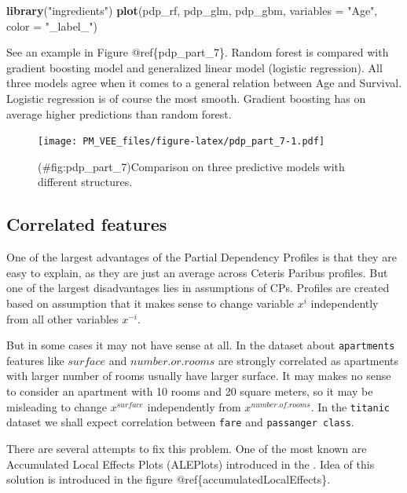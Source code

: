 \documentclass[]{krantz}
\newenvironment{Shaded}{\begin{snugshade}}{\end{snugshade}}
\newcommand{\DataTypeTok}[1]{\textcolor[rgb]{0.13,0.29,0.53}{#1}}
\newcommand{\KeywordTok}[1]{\textcolor[rgb]{0.13,0.29,0.53}{\textbf{#1}}}
\newcommand{\NormalTok}[1]{#1}
\newcommand{\StringTok}[1]{\textcolor[rgb]{0.31,0.60,0.02}{#1}}
\theoremstyle{definition}
\theoremstyle{definition}
\theoremstyle{definition}
\theoremstyle{remark}
\begin{document}
\begin{Shaded}
\begin{Highlighting}[]
\KeywordTok{library}\NormalTok{(}\StringTok{"ingredients"}\NormalTok{)}
\KeywordTok{plot}\NormalTok{(pdp_rf, pdp_glm, pdp_gbm, }\DataTypeTok{variables =} \StringTok{"Age"}\NormalTok{, }\DataTypeTok{color =} \StringTok{"_label_"}\NormalTok{)}
\end{Highlighting}
\end{Shaded}

See an example in Figure @ref\{pdp\_part\_7\}. Random forest is compared
with gradient boosting model and generalized linear model (logistic
regression). All three models agree when it comes to a general relation
between Age and Survival. Logistic regression is of course the most
smooth. Gradient boosting has on average higher predictions than random
forest.

\begin{figure}
\centering
\texttt{[image: PM\_VEE\_files/figure-latex/pdp\_part\_7-1.pdf]}
\caption{(\#fig:pdp\_part\_7)Comparison on three predictive models with
different structures.}
\end{figure}

\hypertarget{correlated-features}{%
\subsection{Correlated features}\label{correlated-features}}

One of the largest advantages of the Partial Dependency Profiles is that
they are easy to explain, as they are just an average across Ceteris
Paribus profiles. But one of the largest disadvantages lies in
assumptions of CPs. Profiles are created based on assumption that it
makes sense to change variable \(x^i\) independently from all other
variables \(x^{-i}\).

But in some cases it may not have sense at all. In the dataset about
\texttt{apartments} features like \(surface\) and \(number.or.rooms\)
are strongly correlated as apartments with larger number of rooms
usually have larger surface. It may makes no sense to consider an
apartment with 10 rooms and 20 square meters, so it may be misleading to
change \(x^{surface}\) independently from \(x^{number.of.rooms}\). In
the \texttt{titanic} dataset we shall expect correlation between
\texttt{fare} and \texttt{passanger\ class}.

There are several attempts to fix this problem. One of the most known
are Accumulated Local Effects Plots (ALEPlots) introduced in the
\citep{R-ALEPlot}. Idea of this solution is introduced in the figure
@ref\{accumulatedLocalEffects\}.
\end{document}
